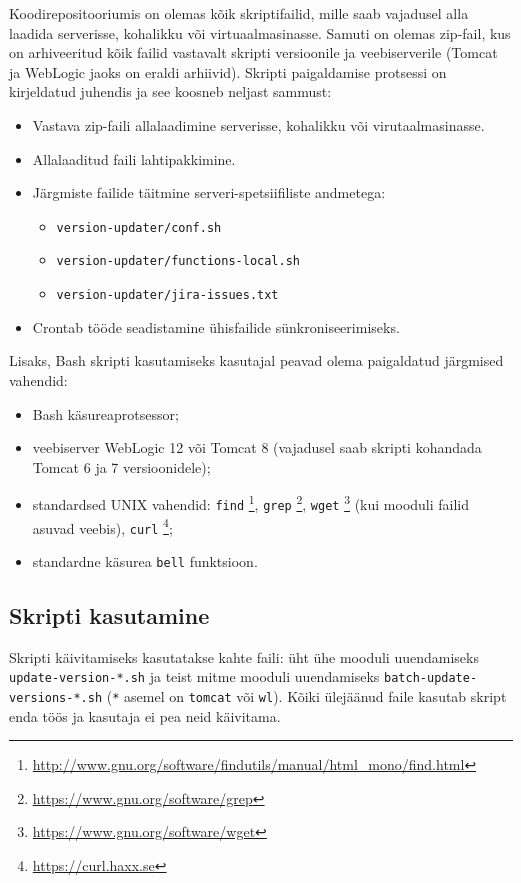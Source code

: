 \documentclass[12pt]{article}
\newcommand{\code}[1]{\texttt{#1}}
\begin{document}
  Koodirepositooriumis on olemas kõik skriptifailid, mille saab vajadusel alla laadida serverisse, kohalikku või virtuaalmasinasse. Samuti on olemas zip\--fail, kus on arhiveeritud kõik failid vastavalt skripti versioonile ja veebiserverile (Tomcat ja WebLogic jaoks on eraldi arhiivid). Skripti paigaldamise protsessi on kirjeldatud juhendis ja see koosneb neljast sammust:
  \begin{itemize}
    \item Vastava zip\--faili allalaadimine serverisse, kohalikku või virutaalmasinasse.
    \item Allalaaditud faili lahtipakkimine.
    \item Järgmiste failide täitmine serveri\--spetsiifiliste andmetega:
    \begin{itemize}
      \item \code{version-updater/conf.sh}
      \item \code{version-updater/functions-local.sh}
      \item \code{version-updater/jira-issues.txt}
    \end{itemize}
    \item Crontab tööde seadistamine ühisfailide sünkroniseerimiseks.
  \end{itemize}
  
  Lisaks, Bash skripti kasutamiseks kasutajal peavad olema paigaldatud järgmised vahendid:
  \begin{itemize}
    \item Bash käsureaprotsessor;
    \item veebiserver WebLogic 12 või Tomcat 8 (vajadusel saab skripti kohandada Tomcat 6 ja 7 versioonidele);
    \item standardsed UNIX vahendid: \code{find} \footnote{\url{http://www.gnu.org/software/findutils/manual/html_mono/find.html}}, \code{grep} \footnote{\url{https://www.gnu.org/software/grep}}, \code{wget} \footnote{\url{https://www.gnu.org/software/wget}} (kui mooduli failid asuvad veebis), \code{curl} \footnote{\url{https://curl.haxx.se}};
    \item standardne käsurea \code{bell} funktsioon.
  \end{itemize}

  \newpage
  
  \subsection{Skripti kasutamine} 
   
  Skripti käivitamiseks kasutatakse kahte faili: üht ühe mooduli uuendamiseks \code{update-version-*.sh} ja teist mitme mooduli uuendamiseks \code{batch-update-versions-*.sh} (\code{*} asemel on \code{tomcat} või \code{wl}). Kõiki ülejäänud faile kasutab skript enda töös ja kasutaja ei pea neid käivitama.
  
\end{document}
